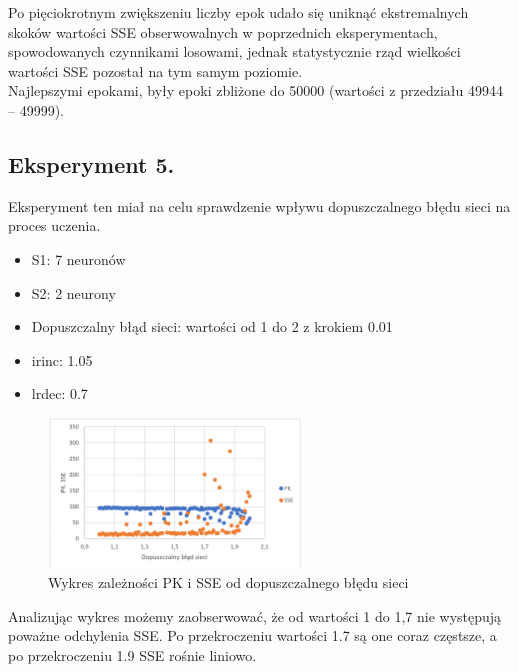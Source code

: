 \documentclass[a4paper, openright, twoside,11pt]{article}
\begin{document}
        Po pięciokrotnym zwiększeniu liczby epok udało się uniknąć ekstremalnych skoków wartości SSE obserwowalnych w poprzednich eksperymentach, spowodowanych czynnikami losowami, jednak statystycznie rząd wielkości wartości SSE pozostał na tym samym poziomie.\\
        Najlepszymi epokami, były epoki zbliżone do 50000 (wartości z przedziału 49944 – 49999).
        
        \clearpage
        \subsection{Eksperyment 5.}
        Eksperyment ten miał na celu sprawdzenie wpływu dopuszczalnego błędu sieci na proces uczenia.
        \begin{itemize}
            \item S1: 7 neuronów
            \item S2: 2 neurony
            \item Dopuszczalny błąd sieci: wartości od 1 do 2 z krokiem 0.01
            \item ir\textunderscore inc: 1.05
            \item lr\textunderscore dec: 0.7
        \end{itemize}
         \begin{figure}[!h]
            \centering
            \includegraphics[width = 0.6\textwidth]{Grafika/eksperymenty/pksse5.png}
            \caption {Wykres zależności PK i SSE od dopuszczalnego błędu sieci}
            \label{fig:PSSEKeksperyment5}
        \end{figure}
        Analizując wykres możemy zaobserwować, że od wartości 1 do 1,7 nie występują poważne odchylenia SSE. Po przekroczeniu wartości 1.7 są one coraz częstsze, a po przekroczeniu 1.9 SSE rośnie liniowo.
        
        \clearpage
\end{document}
